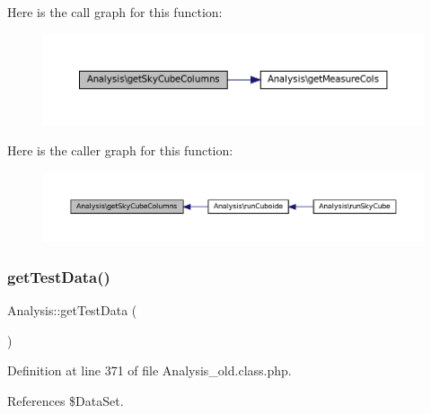 Here is the call graph for this function\+:\nopagebreak
\begin{figure}[H]
\begin{center}
\leavevmode
\includegraphics[width=350pt]{class_analysis_aa72f4d177d42a08267acf6442d9dd901_cgraph}
\end{center}
\end{figure}
Here is the caller graph for this function\+:\nopagebreak
\begin{figure}[H]
\begin{center}
\leavevmode
\includegraphics[width=350pt]{class_analysis_aa72f4d177d42a08267acf6442d9dd901_icgraph}
\end{center}
\end{figure}
\mbox{\label{class_analysis_a03e4f465ff77ad240a13f25de5c559b3}} 
\subsubsection{\texorpdfstring{get\+Test\+Data()}{getTestData()}\hspace{0.1cm}{\footnotesize\ttfamily [1/2]}}
{\footnotesize\ttfamily Analysis\+::get\+Test\+Data (\begin{DoxyParamCaption}{ }\end{DoxyParamCaption})\hspace{0.3cm}{\ttfamily [protected]}}



Definition at line 371 of file Analysis\+\_\+old.\+class.\+php.



References \$\+Data\+Set.

\mbox{\label{class_analysis_a03e4f465ff77ad240a13f25de5c559b3}} 
